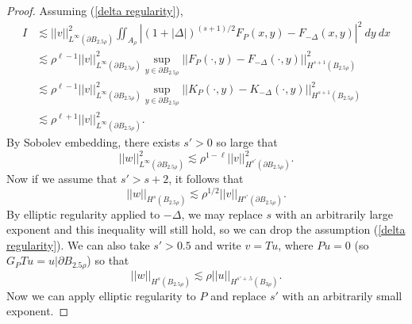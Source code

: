 \documentclass[reqno,12pt,letterpaper]{amsart}
\theoremstyle{definition}
\numberwithin{equation}{section}
\begin{document}
\begin{proof}
Assuming (\ref{delta regularity}),
\begin{align*}
I &\lesssim ||v||_{L^\infty(\partial B_{2.5\rho})}^2 \iint_{A_\rho} |(1 + |\Delta|)^{(s+1)/2} F_P(x, y) - F_{-\Delta}(x, y)|^2 ~dy ~dx\\
&\lesssim \rho^{\ell - 1} ||v||_{L^\infty(\partial B_{2.5\rho})}^2 \sup_{y \in \partial B_{2.5\rho}} ||F_P(\cdot, y) - F_{-\Delta}(\cdot, y)||_{H^{s + 1}(B_{2.5\rho})}^2\\
&\lesssim \rho^{\ell - 1} ||v||_{L^\infty(\partial B_{2.5\rho})}^2 \sup_{y \in \partial B_{2.5\rho}} ||K_P(\cdot, y) - K_{-\Delta}(\cdot, y)||_{H^{s + 1}(B_{2.5\rho})}^2\\
&\lesssim \rho^{\ell + 1} ||v||_{L^\infty(\partial B_{2.5\rho})}^2.
\end{align*}
By Sobolev embedding, there exists $s' > 0$ so large that
$$||w||_{L^\infty(\partial B_{2.5\rho})}^2 \lesssim \rho^{1-\ell} ||v||_{H^{s'}(\partial B_{2.5\rho})}^2.$$
Now if we assume that $s' > s + 2$, it follows that
$$||w||_{H^s(B_{2.5\rho})} \lesssim \rho^{1/2} ||v||_{H^{s'}(\partial B_{2.5\rho})}.$$
By elliptic regularity applied to $-\Delta$, we may replace $s$ with an arbitrarily large exponent and this inequality will still hold, so we can drop the assumption (\ref{delta regularity}).
We can also take $s' > 0.5$ and write $v = Tu$, where $Pu = 0$ (so $G_PTu = u|\partial B_{2.5\rho}$) so that
$$||w||_{H^s(B_{2.5\rho})} \lesssim \rho ||u||_{H^{s' + .5}(B_{3\rho})}.$$
Now we can apply elliptic regularity to $P$ and replace $s'$ with an arbitrarily small exponent.
\end{proof}
\end{document}
